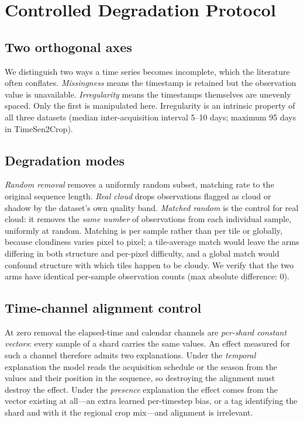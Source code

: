 \documentclass[journal]{IEEEtran}
\begin{document}
\section{Controlled Degradation Protocol}
\label{sec:protocol}

\subsection{Two orthogonal axes}
We distinguish two ways a time series becomes incomplete, which the literature
often conflates. \emph{Missingness} means the timestamp is retained but the
observation value is unavailable. \emph{Irregularity} means the timestamps
themselves are unevenly spaced. Only the first is manipulated here.
Irregularity is an intrinsic property of all three datasets (median
inter-acquisition interval 5--10 days; maximum 95 days in TimeSen2Crop).

\subsection{Degradation modes}
\emph{Random removal} removes a uniformly random subset, matching rate to the
original sequence length. \emph{Real cloud} drops observations flagged as cloud
or shadow by the dataset's own quality band. \emph{Matched random} is the
control for real cloud: it removes the \emph{same number} of observations from
each individual sample, uniformly at random. Matching is per sample rather than
per tile or globally, because cloudiness varies pixel to pixel; a tile-average
match would leave the arms differing in both structure and per-pixel
difficulty, and a global match would confound structure with which tiles happen
to be cloudy. We verify that the two arms have identical per-sample observation
counts (max absolute difference: 0).

\subsection{Time-channel alignment control}
At zero removal the elapsed-time and calendar channels are \emph{per-shard
constant vectors}: every sample of a shard carries the same values. An effect
measured for such a channel therefore admits two explanations. Under the
\emph{temporal} explanation the model reads the acquisition schedule or the
season from the values and their position in the sequence, so destroying the
alignment must destroy the effect. Under the \emph{presence} explanation the
effect comes from the vector existing at all---an extra learned per-timestep
bias, or a tag identifying the shard and with it the regional crop mix---and
alignment is irrelevant.
\end{document}
